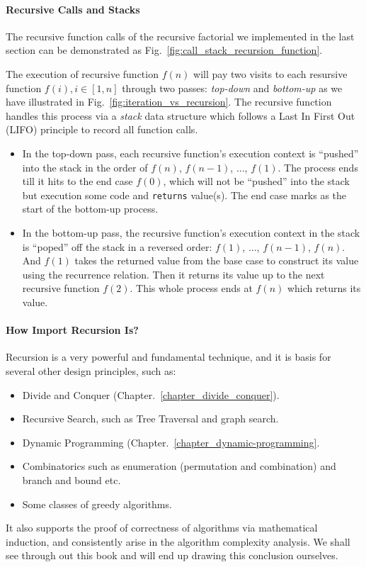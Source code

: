 \documentclass[../main.tex]{subfiles}
\begin{document}
\paragraph{Recursive Calls and Stacks}
The recursive function calls of the recursive factorial we implemented in the last section can be demonstrated as Fig.~\ref{fig:call_stack_recursion_function}. 

The execution of recursive function $f(n)$ will pay two visits to each resursive function $f(i), i \in [1, n]$ through two passes: \textit{top-down} and \textit{bottom-up} as we have illustrated in Fig.~\ref{fig:iteration_vs_recursion}. The recursive function handles this process via a \textit{stack} data structure which follows a Last In First Out (LIFO) principle to record all function calls.

\begin{itemize}
    \item In the top-down pass, each recursive function's execution context is ``pushed'' into the stack in the order of $f(n)$, $f(n-1)$, ..., $f(1)$. The process ends till it hits to the end case $f(0)$, which will not be ``pushed'' into the stack but execution some code and \texttt{returns} value(s). The end case marks as the start of the bottom-up process.

\item In the bottom-up pass, the recursive function's execution context in the stack is ``poped'' off the stack in a reversed order: $f(1)$, ..., $f(n-1)$, $f(n)$. And $f(1)$ takes the returned value from the base case to construct its value using the recurrence relation. Then it returns its value up to the next recursive function $f(2)$. This whole process ends at $f(n)$ which returns its value. 
\end{itemize}

\paragraph{How Import Recursion Is?} 
Recursion is a very powerful and fundamental technique, and it is basis for several other design principles, such as:
\begin{itemize}
    \item Divide and Conquer (Chapter.~\ref{chapter_divide_conquer}).
    \item Recursive Search, such as Tree Traversal and graph search.
    \item Dynamic Programming (Chapter.~\ref{chapter_dynamic-programming}.
    \item Combinatorics such as enumeration (permutation and combination) and branch and bound etc.
    \item Some classes of greedy algorithms.
\end{itemize}
It also supports the proof of correctness of algorithms via mathematical induction, and consistently arise in the algorithm complexity analysis. We shall see through out this book and will end up drawing this conclusion ourselves. 
\end{document}
